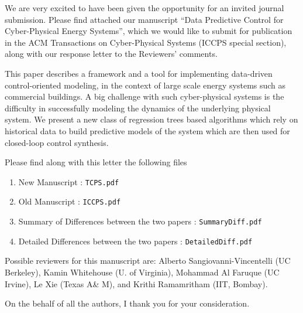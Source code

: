 \documentclass[10pt,stdletter,dateno,sigleft]{newlfm} %
\begin{document}
\begin{newlfm}

We are very excited to have been given the opportunity for an invited journal submission.
Please find attached our manuscript ``Data Predictive Control for Cyber-Physical Energy Systems'', which we would like to submit for publication in the ACM Transactions on Cyber-Physical Systems (ICCPS special section), along with our response letter to the Reviewers' comments.

This paper describes a framework and a tool for implementing data-driven control-oriented modeling, in the context of large scale energy systems such as commercial buildings. A big challenge with such cyber-physical systems is the difficulty in successfully modeling the dynamics of the underlying physical system. We present a new class of regression trees based algorithms which rely on historical data to build predictive models of the system which are then used for closed-loop control synthesis.

Please find along with this letter the following files
\begin{enumerate}
\item New Manuscript				: \texttt{TCPS.pdf}
\item Old Manuscript				: \texttt{ICCPS.pdf}
\item Summary of Differences between the two papers : \texttt{SummaryDiff.pdf}
\item Detailed Differences between the two papers :  \texttt{DetailedDiff.pdf}

\end{enumerate}

Possible reviewers for this manuscript are: Alberto Sangiovanni-Vincentelli (UC Berkeley), Kamin Whitehouse (U. of Virginia), Mohammad Al Faruque (UC Irvine), Le Xie (Texas A\& M), and Krithi Ramamritham (IIT, Bombay).

On the behalf of all the authors, I thank you for your consideration.






\end{newlfm}
\end{document}
